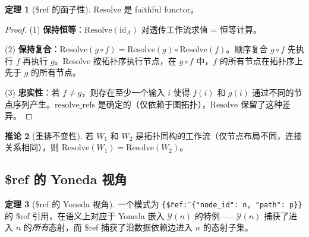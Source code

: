 \documentclass[11pt,a4paper]{article}
\theoremstyle{definition}
\newtheorem{theorem}{定理}[section]
\newtheorem{corollary}[theorem]{推论}
\theoremstyle{definition}
\theoremstyle{remark}
\newcommand{\id}{\mathrm{id}}
\newcommand{\Yoneda}{\mathcal{Y}}
\begin{document}
\begin{theorem}[\$ref 的函子性]
$\mathrm{Resolve}$ 是 faithful functor。
\label{thm:resolve-functor}
\end{theorem}

\begin{proof}
(1) \textbf{保持恒等}：$\mathrm{Resolve}(\id_A)$ 对透传工作流求值 = 恒等计算。\checkmark

(2) \textbf{保持复合}：$\mathrm{Resolve}(g \circ f) = \mathrm{Resolve}(g) \circ \mathrm{Resolve}(f)$。顺序复合 $g \circ f$ 先执行 $f$ 再执行 $g$。$\mathrm{Resolve}$ 按拓扑序执行节点，在 $g \circ f$ 中，$f$ 的所有节点在拓扑序上先于 $g$ 的所有节点。\checkmark

(3) \textbf{忠实性}：若 $f \neq g$，则存在至少一个输入 $i$ 使得 $f(i)$ 和 $g(i)$ 通过不同的节点序列产生。$\mathrm{resolve\_refs}$ 是确定的（仅依赖于图拓扑），$\mathrm{Resolve}$ 保留了这种差异。\checkmark
\end{proof}

\begin{corollary}[重排不变性]
若 $W_1$ 和 $W_2$ 是拓扑同构的工作流（仅节点布局不同，连接关系相同），则 $\mathrm{Resolve}(W_1) = \mathrm{Resolve}(W_2)$。
\end{corollary}

\subsection{\$ref 的 Yoneda 视角}

\begin{theorem}[\$ref 的 Yoneda 视角]
一个模式为 \texttt{\{\"\$ref\": \{"node\_id": n, "path": p\}\}} 的 \$ref 引用，在语义上对应于 Yoneda 嵌入 $\Yoneda(n)$ 的特例——$\Yoneda(n)$ 捕获了进入 $n$ 的\emph{所有}态射，而 \$ref 捕获了沿数据依赖边进入 $n$ 的态射子集。
\label{thm:yoneda-ref}
\end{theorem}
\end{document}
